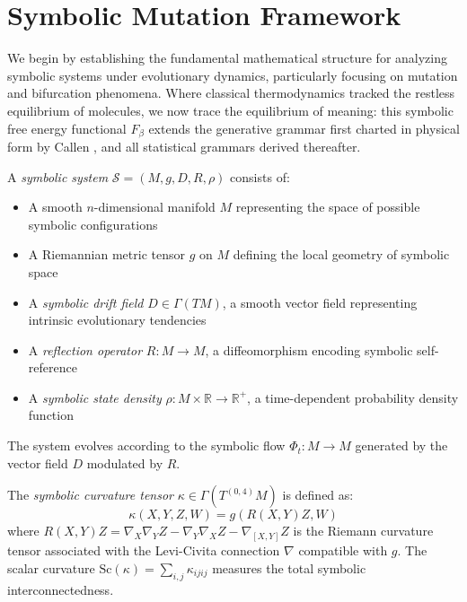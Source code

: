 \section{Symbolic Mutation Framework}
\label{sec:bk6_symbolic_mutation_framework}
We begin by establishing the fundamental mathematical structure for analyzing symbolic systems under evolutionary dynamics, particularly focusing on mutation and bifurcation phenomena. Where classical thermodynamics tracked the restless equilibrium of molecules, we now trace the equilibrium of meaning: this symbolic free energy functional $F_\beta$ extends the generative grammar first charted in physical form by Callen \cite{callen1985thermodynamics}, and all statistical grammars derived thereafter.
\begin{definition}
\label{definition:bk6_symbolic_system}
A \emph{symbolic system} $\mathcal{S} = (M, g, D, R, \rho)$ consists of:
\begin{itemize}
\item A smooth $n$-dimensional manifold $M$ representing the space of possible symbolic configurations
\item A Riemannian metric tensor $g$ on $M$ defining the local geometry of symbolic space
\item A \emph{symbolic drift field} $D \in \Gamma(TM)$, a smooth vector field representing intrinsic evolutionary tendencies
\item A \emph{reflection operator} $R: M \rightarrow M$, a diffeomorphism encoding symbolic self-reference
\item A \emph{symbolic state density} $\rho: M \times \mathbb{R} \rightarrow \mathbb{R}^+$, a time-dependent probability density function
\end{itemize}
The system evolves according to the symbolic flow $\Phi_t: M \rightarrow M$ generated by the vector field $D$ modulated by $R$.
\end{definition}
\begin{definition}
\label{definition:bk6_symbolic_curvature_tensor}
The \emph{symbolic curvature tensor} $\kappa \in \Gamma(T^{(0,4)}M)$ is defined as:
\begin{equation}
\kappa(X,Y,Z,W) = g(R(X,Y)Z, W)
\end{equation}
where $R(X,Y)Z = \nabla_X \nabla_Y Z - \nabla_Y \nabla_X Z - \nabla_{[X,Y]}Z$ is the Riemann curvature tensor associated with the Levi-Civita connection $\nabla$ compatible with $g$. The scalar curvature $\text{Sc}(\kappa) = \sum_{i,j} \kappa_{ijij}$ measures the total symbolic interconnectedness.
\end{definition}
